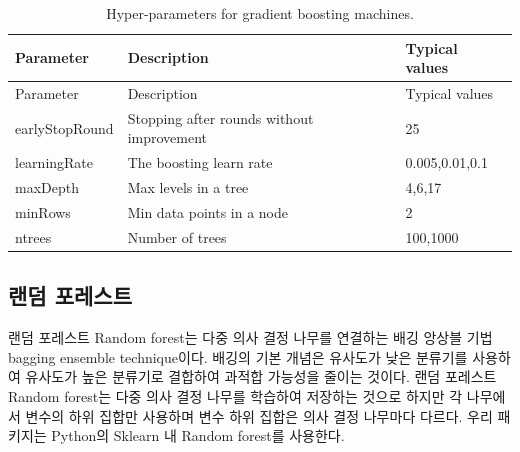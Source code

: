 \documentclass[10.5pt]{book}
\theoremstyle{definition}
\theoremstyle{definition}
\theoremstyle{definition}
\theoremstyle{remark}
\begin{document}
\begin{longtable}[]{@{}lll@{}}
\caption{\label{tab:gbmParameters} Hyper-parameters for gradient boosting
machines.}\tabularnewline
\toprule
Parameter & Description & Typical values\tabularnewline
\midrule
\endfirsthead
\toprule
Parameter & Description & Typical values\tabularnewline
\midrule
\endhead
earlyStopRound & Stopping after rounds without improvement &
25\tabularnewline
learningRate & The boosting learn rate & 0.005,0.01,0.1\tabularnewline
maxDepth & Max levels in a tree & 4,6,17\tabularnewline
minRows & Min data points in a node & 2\tabularnewline
ntrees & Number of trees & 100,1000\tabularnewline
\bottomrule
\end{longtable}

\subsection{랜덤 포레스트}\label{-}

랜덤 포레스트 Random forest는 다중 의사 결정 나무를 연결하는 배깅 앙상블
기법 bagging ensemble technique이다. 배깅의 기본 개념은 유사도가 낮은
분류기를 사용하여 유사도가 높은 분류기로 결합하여 과적합 가능성을 줄이는
것이다. 랜덤 포레스트 Random forest는 다중 의사 결정 나무를 학습하여
저장하는 것으로 하지만 각 나무에서 변수의 하위 집합만 사용하며 변수 하위
집합은 의사 결정 나무마다 다르다. 우리 패키지는 Python의 Sklearn 내
Random forest를 사용한다.  
\end{document}
